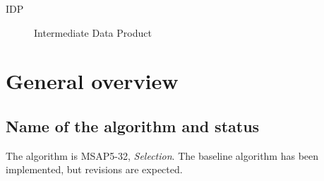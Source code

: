 \documentclass[a4paper, oneside, 11pt, article, english]{memoir}
\begin{document}
\begin{description}
  \firmlist
  \item[IDP] Intermediate Data Product
\end{description}


\clearpage
\chapter{General overview}
\label{chap:overview}

\section{Name of the algorithm and status}
\label{sec:name}
The algorithm is MSAP5-32, \emph{Selection}. 
The baseline algorithm has been implemented, but revisions are expected. 
\end{document}
